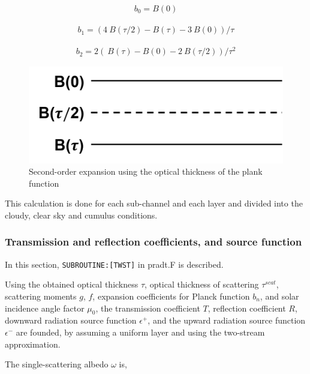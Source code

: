 \begin{eqnarray}
b_{0}=B(0)
\end{eqnarray}

\begin{eqnarray}
b_{1}=(4{~B}(\tau / 2)-{B}(\tau)-3{~B}(0)) / \tau
\end{eqnarray}

\begin{eqnarray}
b_{2}=2({~B}(\tau)-{B}(0)-2{~B}(\tau / 2)) / \tau^{2}
\end{eqnarray}

\begin{figure}
\centering
\includegraphics{Prad_Fig2.png}
\caption{Second-order expansion using the optical thickness of the plank
function}
\end{figure}

This calculation is done for each sub-channel and each layer and divided
into the cloudy, clear sky and cumulus conditions.

\hypertarget{transmission-and-reflection-coefficients-and-source-function}{%
\subsubsection{Transmission and reflection coefficients, and source
function}\label{transmission-and-reflection-coefficients-and-source-function}}

In this section, \texttt{SUBROUTINE:{[}TWST{]}} in pradt.F is described.

Using the obtained optical thickness \(\tau\), optical thickness of
scattering \(\tau^{scat}\), scattering moments \(g\), \(f\), expansion
coefficients for Planck function \(b_n\), and solar incidence angle
factor \(\mu_{0}\), the transmission coefficient \(T\), reflection
coefficient \(R\), downward radiation source function \(\epsilon^{+}\),
and the upward radiation source function \(\epsilon^{-}\) are founded,
by assuming a uniform layer and using the two-stream approximation.

The single-scattering albedo \(\omega\) is,

